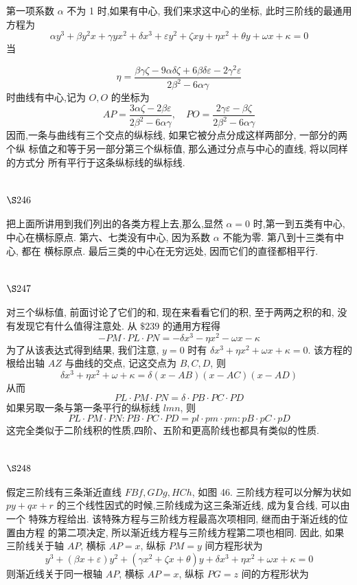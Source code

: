 第一项系数 $\alpha$ 不为 1 时,如果有中心, 我们来求这中心的坐标, 此时三阶线的最通用 方程为
\[
\alpha y^{3}+\beta y^{2} x+\gamma y x^{2}+\delta x^{3}+\varepsilon y^{2}+\zeta x y+\eta x^{2}+\theta y+\omega x+\kappa=0
\]
当 

\[
\eta=\frac{\beta \gamma \zeta-9 \alpha \delta \zeta+6 \beta \delta \varepsilon-2 \gamma^2 \varepsilon}{2 \beta^2-6 \alpha \gamma}
\]
时曲线有中心,记为 $O, O$ 的坐标为
\[
A P=\frac{3 \alpha \zeta-2 \beta \varepsilon}{2 \beta^{2}-6 \alpha \gamma}, \quad P O=\frac{2 \gamma \varepsilon-\beta \zeta}{2 \beta^{2}-6 \alpha \gamma}
\]
因而,一条与曲线有三个交点的纵标线, 如果它被分点分成这样两部分, 一部分的两个纵 标值之和等于另一部分第三个纵标值, 那么通过分点与中心的直线, 将以同样的方式分 所有平行于这条纵标线的纵标线.

\section{$\S 246$}

把上面所讲用到我们列出的各类方程上去,那么,显然 $\alpha=0$ 时,第一到五类有中心, 中心在横标原点. 第六、七类没有中心, 因为系数 $\alpha$ 不能为零. 第八到十三类有中心, 都在 横标原点. 最后三类的中心在无穷远处, 因而它们的直径都相平行.

\section{$\S 247$}

对三个纵标值, 前面讨论了它们的和, 现在来看看它们的积, 至于两两之积的和, 没 有发现它有什么值得注意处. 从 $\$ 239$ 的通用方程得
\[
-P M \cdot P L \cdot P N=-\delta x^{3}-\eta x^{2}-\omega x-\kappa
\]
为了从该表达式得到结果, 我们注意, $y=0$ 时有 $\delta x^{3}+\eta x^{2}+\omega x+\kappa=0$. 该方程的根给出轴 $A Z$ 与曲线的交点, 记这交点为 $B, C, D$, 则
\[
\delta x^{3}+\eta x^{2}+\omega+\kappa=\delta(x-A B)(x-A C)(x-A D)
\]
从而
\[
P L \cdot P M \cdot P N=\delta \cdot P B \cdot P C \cdot P D
\]
如果另取一条与第一条平行的纵标线 $l m n$, 则
\[
P L \cdot P M \cdot P N: P B \cdot P C \cdot P D=p l \cdot p m \cdot p m: p B \cdot p C \cdot p D
\]
这完全类似于二阶线积的性质,四阶、五阶和更高阶线也都具有类似的性质.

\section{$\S 248$}

假定三阶线有三条渐近直线 $F B f, G D g, H C h$, 如图 46. 三阶线方程可以分解为状如 $p y+q x+r$ 的三个线性因式的时候,三阶线成为这三条渐近线, 成为复合线, 可以由一个 特殊方程给出. 该特殊方程与三阶线方程最高次项相同, 继而由于渐近线的位置由方程 的第二项决定, 所以渐近线方程与三阶线方程第二项也相同. 因此, 如果三阶线关于轴 $A P$, 横标 $A P=x$, 纵标 $P M=y$ 间方程形状为
\[
y^{3}+(\beta x+\varepsilon) y^{2}+\left(\gamma x^{2}+\zeta x+\theta\right) y+\delta x^{3}+\eta x^{2}+\omega x+\kappa=0
\]
则渐近线关于同一根轴 $A P$, 横标 $A P=x$, 纵标 $P G=z$ 间的方程形状为 


